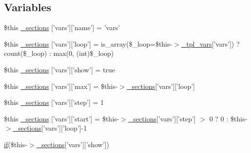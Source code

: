 \subsection*{\-Variables}
\begin{DoxyCompactItemize}
\item 
\$this \hyperlink{34d6fa4bfd5eef6424a9ddc74a166350_2_06_06708_05_06_06708843835_05var_8tpl_8php_abda03313e9c9be714d9e54ae50e3d62a}{\-\_\-sections} \mbox{[}'vars'\mbox{]}\mbox{[}'name'\mbox{]} = 'vars'
\item 
\$this \hyperlink{34d6fa4bfd5eef6424a9ddc74a166350_2_06_06708_05_06_06708843835_05var_8tpl_8php_a9db6f58b94753d2bc1efbc08eaea4d63}{\-\_\-sections} \mbox{[}'vars'\mbox{]}\mbox{[}'loop'\mbox{]} = is\-\_\-array(\$\-\_\-loop=\$this-\/$>$\hyperlink{_06_06127_05_06_0612781687_05pkgelementindex_8tpl_8php_a4a4846d8e68d455590131a05697f67a3}{\-\_\-tpl\-\_\-vars}\mbox{[}'vars'\mbox{]}) ? count(\$\-\_\-loop) \-: max(0, (int)\$\-\_\-loop)
\item 
\$this \hyperlink{34d6fa4bfd5eef6424a9ddc74a166350_2_06_06708_05_06_06708843835_05var_8tpl_8php_a64dbbc8be8d3f61e9507ad21ae97e883}{\-\_\-sections} \mbox{[}'vars'\mbox{]}\mbox{[}'show'\mbox{]} = true
\item 
\$this \hyperlink{34d6fa4bfd5eef6424a9ddc74a166350_2_06_06708_05_06_06708843835_05var_8tpl_8php_adafabdb57ae52f1caf1c56505bc47ec3}{\-\_\-sections} \mbox{[}'vars'\mbox{]}\mbox{[}'max'\mbox{]} = \$this-\/$>$\hyperlink{_06_06127_05_06_0612781687_05pkgelementindex_8tpl_8php_a9e3d26b39edfe29c3f29b8035ef33828}{\-\_\-sections}\mbox{[}'vars'\mbox{]}\mbox{[}'loop'\mbox{]}
\item 
\$this \hyperlink{34d6fa4bfd5eef6424a9ddc74a166350_2_06_06708_05_06_06708843835_05var_8tpl_8php_a9020f074629c1d58d6b3345c11d134a3}{\-\_\-sections} \mbox{[}'vars'\mbox{]}\mbox{[}'step'\mbox{]} = 1
\item 
\$this \hyperlink{34d6fa4bfd5eef6424a9ddc74a166350_2_06_06708_05_06_06708843835_05var_8tpl_8php_adaa939777da845d9eeb78ea1dd5cbb20}{\-\_\-sections} \mbox{[}'vars'\mbox{]}\mbox{[}'start'\mbox{]} = \$this-\/$>$\hyperlink{_06_06127_05_06_0612781687_05pkgelementindex_8tpl_8php_a9e3d26b39edfe29c3f29b8035ef33828}{\-\_\-sections}\mbox{[}'vars'\mbox{]}\mbox{[}'step'\mbox{]} $>$ 0 ? 0 \-: \$this-\/$>$\hyperlink{_06_06127_05_06_0612781687_05pkgelementindex_8tpl_8php_a9e3d26b39edfe29c3f29b8035ef33828}{\-\_\-sections}\mbox{[}'vars'\mbox{]}\mbox{[}'loop'\mbox{]}-\/1
\item 
\hyperlink{_setup_8inc_8php_ad0184337b31d13763ec8751feff4aabe}{if}(\$this-\/$>$\hyperlink{_06_06127_05_06_0612781687_05pkgelementindex_8tpl_8php_a9e3d26b39edfe29c3f29b8035ef33828}{\-\_\-sections}\mbox{[}'vars'\mbox{]}\mbox{[}'show'\mbox{]}) \*

\end{DoxyCompactItemize}
